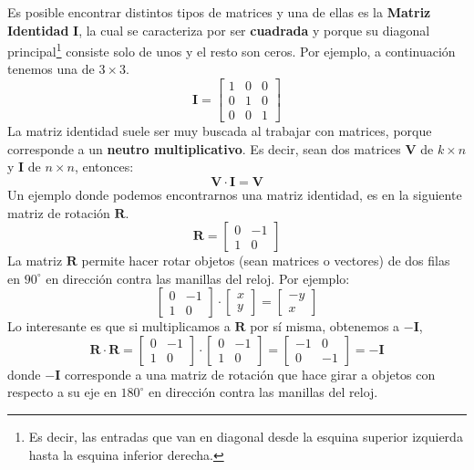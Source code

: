 \documentclass[12pt]{article}
\begin{document}
Es posible encontrar distintos tipos de matrices y una de ellas es la \textbf{Matriz Identidad} $\mathbf{I}$, la cual se caracteriza por ser \textbf{cuadrada} y porque su diagonal principal\footnote{Es decir, las entradas que van en diagonal desde la esquina superior izquierda hasta la esquina inferior derecha.} consiste solo de unos y el resto son ceros. Por ejemplo, a continuación tenemos una de $3 \times 3$.
\[
\mathbf{I} =
\begin{bmatrix}
1 & 0 & 0 \\
0 & 1 & 0 \\
0 & 0 & 1
\end{bmatrix}
\]
La matriz identidad suele ser muy buscada al trabajar con matrices, porque corresponde a un \textbf{neutro multiplicativo}. Es decir, sean dos matrices $\mathbf{V}$ de $k \times n$ y $\mathbf{I}$ de $n \times n$, entonces:
\[
  \mathbf{V} \cdot \mathbf{I} = \mathbf{V}
\]
Un ejemplo donde podemos encontrarnos una matriz identidad, es en la siguiente matriz de rotación $\mathbf{R}$.
\[
\mathbf{R} =
\begin{bmatrix}
0 & -1 \\
1 & 0
\end{bmatrix}
\]
La matriz $\mathbf{R}$ permite hacer rotar objetos (sean matrices o vectores) de dos filas en $90^{\circ}$ en dirección contra las manillas del reloj. Por ejemplo:
\[
\begin{bmatrix}
0 & -1 \\
1 & 0
\end{bmatrix}
\cdot
\begin{bmatrix} x \\ y \end{bmatrix} =
\begin{bmatrix} -y \\ x \end{bmatrix}
\]
Lo interesante es que si multiplicamos a $\mathbf{R}$ por sí misma, obtenemos a $-\mathbf{I}$,
\[
\mathbf{R} \cdot \mathbf{R} =
\begin{bmatrix}
0 & -1 \\
1 & 0
\end{bmatrix} \cdot
\begin{bmatrix}
0 & -1 \\
1 & 0
\end{bmatrix} =
\begin{bmatrix}
-1 & 0 \\
0 & -1
\end{bmatrix} =
- \mathbf{I}
\]
donde $-\mathbf{I}$ corresponde a una matriz de rotación que hace girar a objetos con respecto a su eje en $180^{\circ}$ en dirección contra las manillas del reloj.
\end{document}
